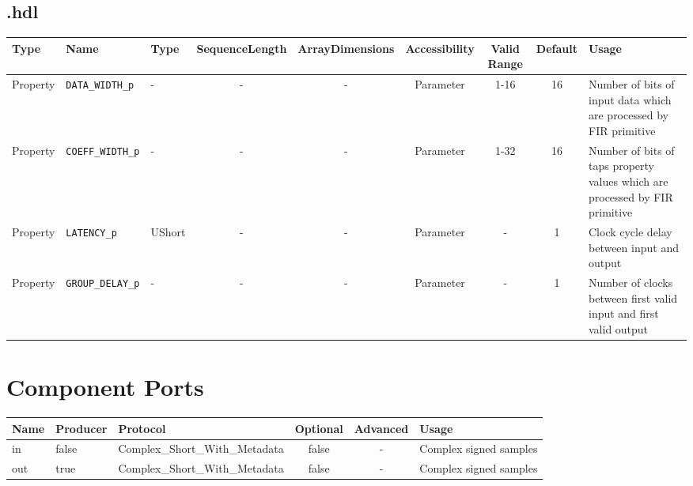 \begin{landscape}
	\subsection*{\comp.hdl}
	\begin{scriptsize}
		\begin{tabular}{|p{3cm}|p{2cm}|p{1cm}|c|c|c|c|c|p{5cm}|}
			\hline
			\rowcolor{blue}
			Type     & Name                 & Type  	& SequenceLength & ArrayDimensions & Accessibility	& Valid Range & Default & Usage                                        \\
			\hline
			Property & \verb+DATA_WIDTH_p+  & -     	& -              & -               & Parameter		& 1-16        & 16      & Number of bits of input data which are processed by FIR primitive \\
			\hline
			Property & \verb+COEFF_WIDTH_p+ & -	 	& -              & -               & Parameter		& 1-32        & 16      & Number of bits of taps property values which are processed by FIR primitive\\
			\hline
			Property & \verb+LATENCY_p+ 	 & UShort	& -              & -               & Parameter		& -           & 1       & Clock cycle delay between input and output   \\
			\hline
			Property & \verb+GROUP_DELAY_p+ & -		& -              & -               & Parameter		& -           & 1       & Number of clocks between first valid input and first valid output\\
			\hline
		\end{tabular}
	\end{scriptsize}


	\section*{Component Ports}
	\begin{scriptsize}
		\begin{tabular}{|M{2cm}|M{1.5cm}|M{4cm}|c|c|M{9cm}|}
			\hline
			\rowcolor{blue}
			Name & Producer & Protocol           					& Optional & Advanced & Usage                  \\
			\hline
			in   & false    & Complex\_Short\_With\_Metadata		& false    & -        & Complex signed samples \\
			\hline
			out  & true     & Complex\_Short\_With\_Metadata		& false    & -        & Complex signed samples \\
			\hline
		\end{tabular}
	\end{scriptsize}


\end{landscape}
